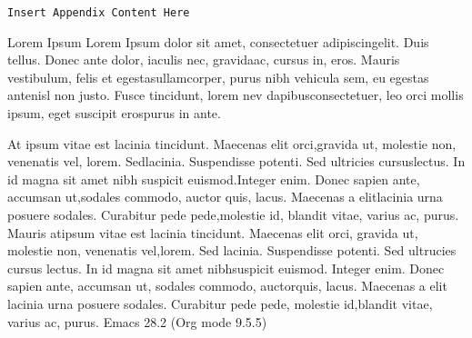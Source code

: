\documentclass[openleft,oneside,showtrims]{memoir}
\begin{document}
\texttt{Insert Appendix Content Here}

Lorem Ipsum Lorem Ipsum dolor sit amet, consectetuer adipiscingelit. Duis tellus. Donec ante dolor, iaculis nec, gravidaac, cursus in, eros. Mauris vestibulum, felis et egestasullamcorper, purus nibh vehicula sem, eu egestas antenisl non justo. Fusce tincidunt, lorem nev dapibusconsectetuer, leo orci mollis ipsum, eget suscipit erospurus in ante.

At ipsum vitae est lacinia tincidunt. Maecenas elit orci,gravida ut, molestie non, venenatis vel, lorem. Sedlacinia. Suspendisse potenti. Sed ultricies cursuslectus. In id magna sit amet nibh suspicit euismod.Integer enim. Donec sapien ante, accumsan ut,sodales commodo, auctor quis, lacus. Maecenas a elitlacinia urna posuere sodales. Curabitur pede pede,molestie id, blandit vitae, varius ac, purus. Mauris atipsum vitae est lacinia tincidunt. Maecenas elit orci, gravida ut, molestie non, venenatis vel,lorem. Sed lacinia. Suspendisse potenti. Sed ultrucies cursus lectus. In id magna sit amet nibhsuspicit euismod. Integer enim. Donec sapien ante, accumsan ut, sodales commodo, auctorquis, lacus. Maecenas a elit lacinia urna posuere sodales. Curabitur pede pede, molestie id,blandit vitae, varius ac, purus.
Emacs 28.2 (Org mode 9.5.5)
\end{document}
